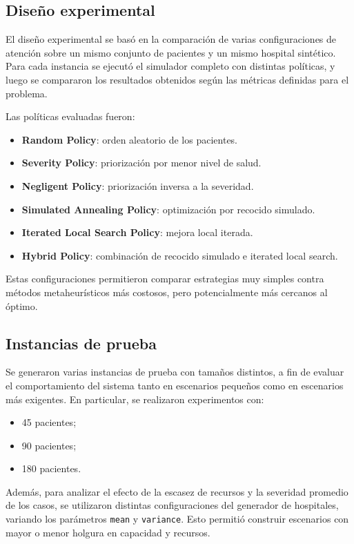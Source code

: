 \documentclass[12pt,a4paper]{article}
\begin{document}
\subsection{Diseño experimental}

El diseño experimental se basó en la comparación de varias configuraciones de atención sobre un mismo conjunto de pacientes 
y un mismo hospital sintético. 
Para cada instancia se ejecutó el simulador completo con distintas políticas, 
y luego se compararon los resultados obtenidos según las métricas definidas para el problema.

Las políticas evaluadas fueron:

\begin{itemize}
    \item \textbf{Random Policy}: orden aleatorio de los pacientes.
    \item \textbf{Severity Policy}: priorización por menor nivel de salud.
    \item \textbf{Negligent Policy}: priorización inversa a la severidad.
    \item \textbf{Simulated Annealing Policy}: optimización por recocido simulado.
    \item \textbf{Iterated Local Search Policy}: mejora local iterada.
    \item \textbf{Hybrid Policy}: combinación de recocido simulado e iterated local search.
\end{itemize}

Estas configuraciones permitieron comparar estrategias muy simples contra métodos metaheurísticos más costosos, 
pero potencialmente más cercanos al óptimo.

\subsection{Instancias de prueba}

Se generaron varias instancias de prueba con tamaños distintos, a fin de evaluar el comportamiento del sistema 
tanto en escenarios pequeños como en escenarios más exigentes. En particular, se realizaron experimentos con:

\begin{itemize}
    \item 45 pacientes;
    \item 90 pacientes;
    \item 180 pacientes.
\end{itemize}

Además, para analizar el efecto de la escasez de recursos y la severidad promedio de los casos, 
se utilizaron distintas configuraciones del generador de hospitales, 
variando los parámetros \texttt{mean} y \texttt{variance}. 
Esto permitió construir escenarios con mayor o menor holgura en capacidad y recursos.
\end{document}
